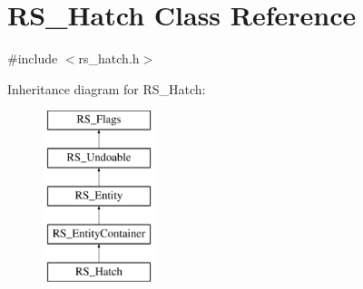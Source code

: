 \hypertarget{classRS__Hatch}{\section{R\-S\-\_\-\-Hatch Class Reference}
\label{classRS__Hatch}
}


{\ttfamily \#include $<$rs\-\_\-hatch.\-h$>$}

Inheritance diagram for R\-S\-\_\-\-Hatch\-:\begin{figure}[H]
\begin{center}
\leavevmode
\includegraphics[height=5.000000cm]{classRS__Hatch}
\end{center}
\end{figure}
